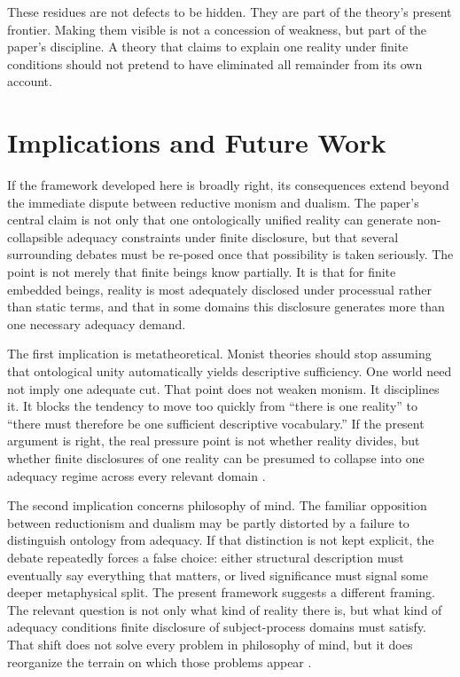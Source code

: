 \documentclass[11pt]{article}
\begin{document}
These residues are not defects to be hidden. They are part of the theory's present frontier. Making them visible is not a concession of weakness, but part of the paper's discipline. A theory that claims to explain one reality under finite conditions should not pretend to have eliminated all remainder from its own account.
\section{Implications and Future Work}

If the framework developed here is broadly right, its consequences extend beyond the immediate dispute between reductive monism and dualism. The paper's central claim is not only that one ontologically unified reality can generate non-collapsible adequacy constraints under finite disclosure, but that several surrounding debates must be re-posed once that possibility is taken seriously. The point is not merely that finite beings know partially. It is that for finite embedded beings, reality is most adequately disclosed under processual rather than static terms, and that in some domains this disclosure generates more than one necessary adequacy demand.

The first implication is metatheoretical. Monist theories should stop assuming that ontological unity automatically yields descriptive sufficiency. One world need not imply one adequate cut. That point does not weaken monism. It disciplines it. It blocks the tendency to move too quickly from ``there is one reality'' to ``there must therefore be one sufficient descriptive vocabulary.'' If the present argument is right, the real pressure point is not whether reality divides, but whether finite disclosures of one reality can be presumed to collapse into one adequacy regime across every relevant domain \cite{Nagel1986,Levine1983,Chalmers1995}.

The second implication concerns philosophy of mind. The familiar opposition between reductionism and dualism may be partly distorted by a failure to distinguish ontology from adequacy. If that distinction is not kept explicit, the debate repeatedly forces a false choice: either structural description must eventually say everything that matters, or lived significance must signal some deeper metaphysical split. The present framework suggests a different framing. The relevant question is not only what kind of reality there is, but what kind of adequacy conditions finite disclosure of subject-process domains must satisfy. That shift does not solve every problem in philosophy of mind, but it does reorganize the terrain on which those problems appear \cite{Nagel1974,Levine1983,Chalmers1995}.
\end{document}
